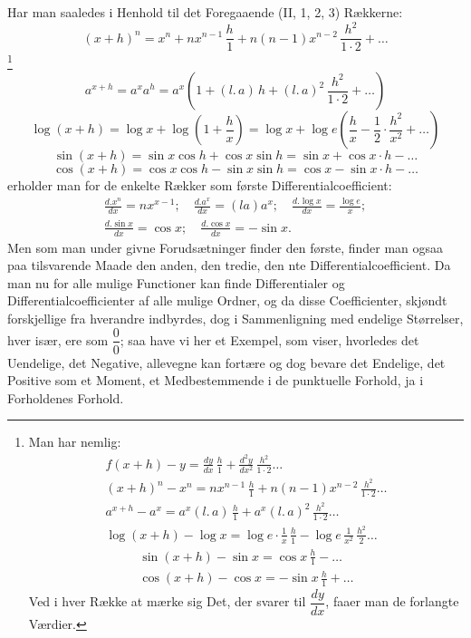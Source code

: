\documentclass[12pt]{book}
\newcommand{\opage}[1]{\marginnote{\footnotesize\textit{[#1]}}}
\begin{document}
Har man saaledes i Henhold til det Foregaaende (II, 1, 2, 3) Rækkerne:
\[
(x + h)^{n} = x^{n} + nx^{n-1}\,\frac{h}{1} + n(n - 1)x^{n-2}\,\frac{h^{2}}{1\cdot2}
+ \dots
\]\footnote{Man har nemlig:
\begin{gather*}
f(x + h) - y = \frac{dy}{dx}\,\frac{h}{1} + \frac{d^{2}y}{dx^{2}}\,
\frac{h^{2}}{1\cdot2} \dots\\
(x + h)^{n} - x^{n} = nx^{n-1}\,\frac{h}{1} + n(n - 1)x^{n-2}\,
\frac{h^{2}}{1\cdot2} \dots\\
a^{x+h} - a^{x} = a^{x}(l.\,a)\,\frac{h}{1} + a^{x}(l.\,a)^{2}\,
\frac{h^{2}}{1\cdot2} \dots\\
\log(x + h) - \log x = \log e\cdot\frac{1}{x}\,\frac{h}{1}
- \log e\,\frac{1}{x^{2}}\,\frac{h^{2}}{2} \dots
\end{gather*}
\begin{gather*}
\sin(x + h) - \sin x = \cos x\,\frac{h}{1} - \dots\\
\cos(x + h) - \cos x = -\sin x\,\frac{h}{1} + \dots
\end{gather*}
Ved i hver Række at mærke sig Det, der svarer til $\dfrac{dy}{dx}$, faaer man de
forlangte Værdier.}
\opage{58} \[
a^{x+h} = a^{x}a^{h} = a^{x}\left(1 + (l.\,a)\,h + (l.\,a)^{2}\,\frac{h^{2}}{1\cdot2}
+ \dots\right)
\]
\[
\log(x + h) = \log x + \log\left(1 + \frac{h}{x}\right)
= \log x + \log e\left(\frac{h}{x} - \frac{1}{2}\cdot\frac{h^{2}}{x^{2}} + \dots\right)
\]
\[
\sin(x + h) = \sin x\cos h + \cos x\sin h = \sin x + \cos x\cdot h - \dots
\]
\[
\cos(x + h) = \cos x\cos h - \sin x\sin h = \cos x - \sin x\cdot h - \dots
\]
erholder man for de enkelte Rækker som første Differentialcoefficient:
\begin{gather*}
\frac{d.x^{n}}{dx} = nx^{x-1};\quad \frac{d.a^{x}}{dx} = (la)a^{x};\quad
\frac{d.\log x}{dx} = \frac{\log e}{x};\\
\frac{d.\sin x}{dx} = \cos x;\quad \frac{d.\cos x}{dx} = -\sin x.
\end{gather*}
Men som man under givne Forudsætninger finder den første, finder man ogsaa paa
tilsvarende Maade den anden, den tredie, den nte Differentialcoefficient. Da man nu
for alle mulige Functioner kan finde Differentialer og Differentialcoefficienter af
alle mulige Ordner, og da disse Coefficienter, skjøndt forskjellige fra hverandre
indbyrdes, dog i Sammenligning med endelige Størrelser, hver især, ere som
$\dfrac{0}{0}$; saa have vi her et Exempel, som viser, hvorledes det Uendelige, det
Negative, allevegne kan fortære og dog bevare det Endelige, det Positive som et
Moment, et Medbestemmende i de punktuelle Forhold, ja i Forholdenes Forhold.
\end{document}
